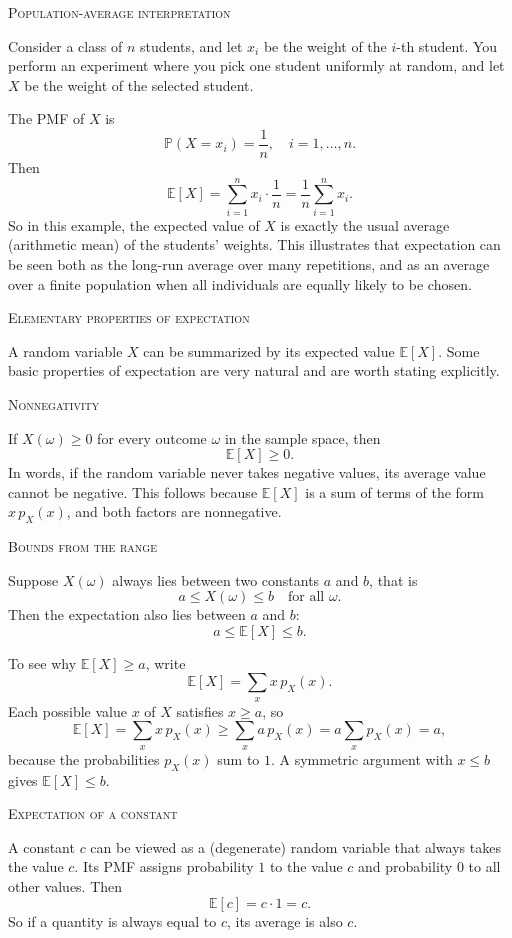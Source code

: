 \bigskip\textsc{Population-average interpretation}

Consider a class of \(n\) students, and let \(x_i\) be the weight of the \(i\)-th student.  
You perform an experiment where you pick one student uniformly at random, and let \(X\) be the weight of the selected student.  

The PMF of \(X\) is
\[
\mathbb{P}(X = x_i) = \frac{1}{n}, \quad i = 1,\dots,n.
\]
Then
\[
\mathbb{E}[X] = \sum_{i=1}^{n} x_i \cdot \frac{1}{n}
              = \frac{1}{n} \sum_{i=1}^{n} x_i.
\]
So in this example, the expected value of \(X\) is exactly the usual average (arithmetic mean) of the students’ weights.  
This illustrates that expectation can be seen both as the long-run average over many repetitions, and as an average over a finite population when all individuals are equally likely to be chosen.


\bigskip\textsc{Elementary properties of expectation}

A random variable \(X\) can be summarized by its expected value \(\mathbb{E}[X]\).  
Some basic properties of expectation are very natural and are worth stating explicitly.

\bigskip\textsc{Nonnegativity}

If \(X(\omega) \ge 0\) for every outcome \(\omega\) in the sample space, then
\[
\mathbb{E}[X] \ge 0.
\]
In words, if the random variable never takes negative values, its average value cannot be negative.  
This follows because \(\mathbb{E}[X]\) is a sum of terms of the form \(x \, p_X(x)\), and both factors are nonnegative.

\bigskip\textsc{Bounds from the range}

Suppose \(X(\omega)\) always lies between two constants \(a\) and \(b\), that is
\[
a \le X(\omega) \le b \quad \text{for all } \omega.
\]
Then the expectation also lies between \(a\) and \(b\):
\[
a \le \mathbb{E}[X] \le b.
\]

To see why \(\mathbb{E}[X] \ge a\), write
\[
\mathbb{E}[X] = \sum_{x} x \, p_X(x).
\]
Each possible value \(x\) of \(X\) satisfies \(x \ge a\), so
\[
\mathbb{E}[X]
= \sum_{x} x \, p_X(x)
\ge \sum_{x} a \, p_X(x)
= a \sum_{x} p_X(x)
= a,
\]
because the probabilities \(p_X(x)\) sum to \(1\).  
A symmetric argument with \(x \le b\) gives \(\mathbb{E}[X] \le b\).

\bigskip\textsc{Expectation of a constant}

A constant \(c\) can be viewed as a (degenerate) random variable that always takes the value \(c\).  
Its PMF assigns probability \(1\) to the value \(c\) and probability \(0\) to all other values.  
Then
\[
\mathbb{E}[c] = c \cdot 1 = c.
\]
So if a quantity is always equal to \(c\), its average is also \(c\).


